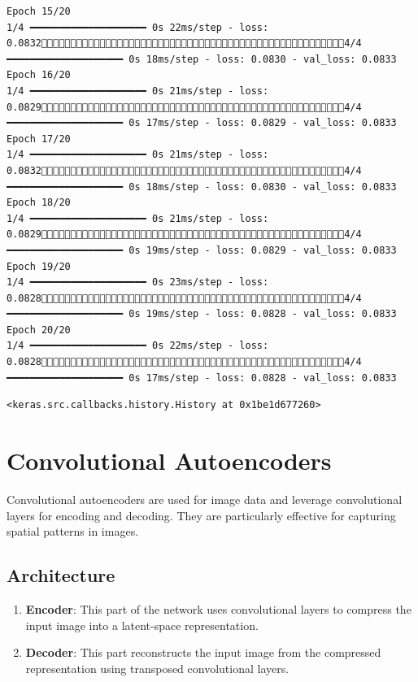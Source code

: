 \documentclass[
  letterpaper,
  DIV=11,
  numbers=noendperiod]{scrreprt}
\providecommand{\tightlist}{%
  \setlength{\itemsep}{0pt}\setlength{\parskip}{0pt}}\usepackage{longtable,booktabs,array}
\begin{document}
\begin{verbatim}
Epoch 15/20
1/4 ━━━━━━━━━━━━━━━━━━━━ 0s 22ms/step - loss: 0.08324/4 ━━━━━━━━━━━━━━━━━━━━ 0s 18ms/step - loss: 0.0830 - val_loss: 0.0833
Epoch 16/20
1/4 ━━━━━━━━━━━━━━━━━━━━ 0s 21ms/step - loss: 0.08294/4 ━━━━━━━━━━━━━━━━━━━━ 0s 17ms/step - loss: 0.0829 - val_loss: 0.0833
Epoch 17/20
1/4 ━━━━━━━━━━━━━━━━━━━━ 0s 21ms/step - loss: 0.08324/4 ━━━━━━━━━━━━━━━━━━━━ 0s 18ms/step - loss: 0.0830 - val_loss: 0.0833
Epoch 18/20
1/4 ━━━━━━━━━━━━━━━━━━━━ 0s 21ms/step - loss: 0.08294/4 ━━━━━━━━━━━━━━━━━━━━ 0s 19ms/step - loss: 0.0829 - val_loss: 0.0833
Epoch 19/20
1/4 ━━━━━━━━━━━━━━━━━━━━ 0s 23ms/step - loss: 0.08284/4 ━━━━━━━━━━━━━━━━━━━━ 0s 19ms/step - loss: 0.0828 - val_loss: 0.0833
Epoch 20/20
1/4 ━━━━━━━━━━━━━━━━━━━━ 0s 22ms/step - loss: 0.08284/4 ━━━━━━━━━━━━━━━━━━━━ 0s 17ms/step - loss: 0.0828 - val_loss: 0.0833
\end{verbatim}

\begin{verbatim}
<keras.src.callbacks.history.History at 0x1be1d677260>
\end{verbatim}

\section{Convolutional Autoencoders}\label{convolutional-autoencoders}

Convolutional autoencoders are used for image data and leverage
convolutional layers for encoding and decoding. They are particularly
effective for capturing spatial patterns in images.

\subsection{Architecture}\label{architecture-2}

\begin{enumerate}
\def\labelenumi{\arabic{enumi}.}
\tightlist
\item
  \textbf{Encoder}: This part of the network uses convolutional layers
  to compress the input image into a latent-space representation.
\item
  \textbf{Decoder}: This part reconstructs the input image from the
  compressed representation using transposed convolutional layers.
\end{enumerate}
\end{document}
